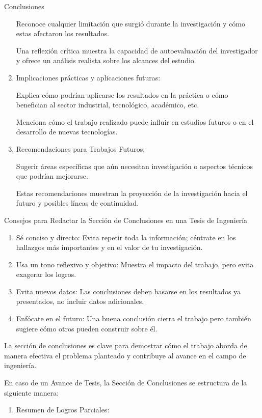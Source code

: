 \documentclass[9pt]{beamer}
\begin{document}
\begin{frame}{Conclusiones}
\begin{enumerate}
    Reconoce cualquier limitación que surgió durante la investigación y cómo estas afectaron los resultados.

    Una reflexión crítica muestra la capacidad de autoevaluación del investigador y ofrece un análisis realista sobre los alcances del estudio.

    \item Implicaciones prácticas y aplicaciones futuras:

    Explica cómo podrían aplicarse los resultados en la práctica o cómo benefician al sector industrial, tecnológico, académico, etc.

    Menciona cómo el trabajo realizado puede influir en estudios futuros o en el desarrollo de nuevas tecnologías.

    \item Recomendaciones para Trabajos Futuros:

    Sugerir áreas específicas que aún necesitan investigación o aspectos técnicos que podrían mejorarse.

    Estas recomendaciones muestran la proyección de la investigación hacia el futuro y posibles líneas de continuidad.
\end{enumerate}

Consejos para Redactar la Sección de Conclusiones en una Tesis de Ingeniería

\begin{enumerate}
    \item Sé conciso y directo: Evita repetir toda la información; céntrate en los hallazgos más importantes y en el valor de tu investigación.
    \item Usa un tono reflexivo y objetivo: Muestra el impacto del trabajo, pero evita exagerar los logros.
    \item Evita nuevos datos: Las conclusiones deben basarse en los resultados ya presentados, no incluir datos adicionales.
    \item Enfócate en el futuro: Una buena conclusión cierra el trabajo pero también sugiere cómo otros pueden construir sobre él.
\end{enumerate}

La sección de conclusiones es clave para demostrar cómo el trabajo aborda de manera efectiva el problema planteado y contribuye al avance en el campo de ingeniería.

En caso de un Avance de Tesis, la Sección de Conclusiones se estructura de la siguiente manera: 

\begin{enumerate}
    \item Resumen de Logros Parciales:


\end{enumerate}
\end{frame}
\end{document}
